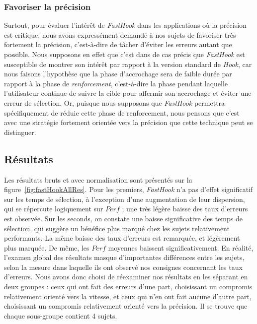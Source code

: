 	\subsubsection{Favoriser la précision}
	Surtout, pour évaluer l'intérêt de \emph{FastHook} dans les applications où la précision est critique, nous avons expressément demandé à nos sujets de favoriser très fortement la précision, c'est-à-dire de tâcher d'éviter les erreurs autant que possible. Nous supposons en effet que c'est dans de cas précis que \emph{FastHook} est susceptible de montrer son intérêt par rapport à la version standard de \emph{Hook}, car nous faisons l'hypothèse que la phase d'accrochage sera de faible durée par rapport à la phase de \emph{renforcement}, c'est-à-dire la phase pendant laquelle l'utilisateur continue de suivre la cible pour affermir son accrochage et éviter une erreur de sélection. Or, puisque nous supposons que \emph{FastHook} permettra spécifiquement de réduie cette phase de renforcement, nous pensons que c'est avec une stratégie fortement orientée vers la précision que cette technique peut se distinguer.

	
	\subsection{Résultats}
	Les résultats bruts et avec normalisation sont présentés sur la figure~\ref{fig:fastHookAllRes}. Pour les premiers, \emph{FastHook} n'a pas d'effet significatif sur les temps de sélection, à l'exception d'une augmentation de leur dispersion, qui se répercute logiquement sur $Perf$ ; une très légère baisse des taux d'erreurs est observée.	Sur les seconds, on constate une baisse significative des temps de sélection, qui suggère un bénéfice plus marqué chez les sujets relativement performants. La même baisse des taux d'erreurs est remarquée, et légèrement plus marquée. De même, les $Perf$ moyennes baissent significativement. En réalité, l'examen global des résultats masque d'importantes différences entre les sujets, selon la mesure dans laquelle ils ont observé nos consignes concernant les taux d'erreurs. Nous avons donc choisi de réexaminer nos résultats en les séparant en deux groupes : ceux qui ont fait des erreurs d'une part, choisissant un compromis relativement orienté vers la vitesse, et ceux qui n'en ont fait aucune d'autre part, choisissant un compromis relativement orienté vers la précision. Il se trouve que chaque sous-groupe contient 4 sujets.
	
